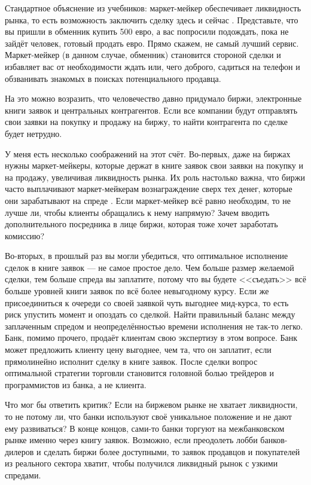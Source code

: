 Стандартное объяснение из учебников: маркет-мейкер обеспечивает ликвидность
рынка, то есть возможность заключить сделку здесь и сейчас \cite[p.
159,223]{hull2015options}. Представьте, что вы пришли в обменник купить
\num{500} евро, а вас попросили подождать, пока не зайдёт человек, готовый
продать евро. Прямо скажем, не самый лучший сервис. Маркет-мейкер (в данном
случае, обменник) становится стороной сделки и избавляет вас от необходимости
ждать или, чего доброго, садиться на телефон и обзванивать знакомых в поисках
потенциального продавца.

На это можно возразить, что человечество давно придумало биржи, электронные
книги заявок и центральных контрагентов. Если все компании будут отправлять свои
заявки на покупку и продажу на биржу, то найти контрагента по сделке будет
нетрудно.

У меня есть несколько соображений на этот счёт. Во-первых, даже на биржах нужны
маркет-мейкеры, которые держат в книге заявок свои заявки на покупку и на
продажу, увеличивая ликвидность рынка. Их роль настолько важна, что биржи часто
выплачивают маркет-мейкерам вознаграждение сверх тех денег, которые они
зарабатывают на спреде \cite{moex2018mm}\cite[ch. 7]{hasbrouck2017securities}.
Если маркет-мейкер всё равно необходим, то не лучше ли, чтобы клиенты обращались
к нему напрямую? Зачем вводить дополнительного посредника в лице биржи, которая
тоже хочет заработать комиссию?

Во-вторых, в прошлый раз вы могли убедиться, что оптимальное исполнение сделок в
книге заявок --- не самое простое дело. Чем больше размер желаемой сделки, тем
больше спреда вы заплатите, потому что вы будете <<съедать>> всё больше уровней
книги заявок по всё более невыгодному курсу. Если же присоединиться к очереди со
своей заявкой чуть выгоднее мид-курса, то есть риск упустить момент и опоздать
со сделкой. Найти правильный баланс между заплаченным спредом и
неопределённостью времени исполнения не так-то легко. Банк, помимо прочего,
продаёт клиентам свою экспертизу в этом вопросе. Банк может предложить клиенту
цену выгоднее, чем та, что он заплатит, если прямолинейно исполнит сделку в
книге заявок. После сделки вопрос оптимальной стратегии торговли становится
головной болью трейдеров и программистов из банка, а не клиента.

Что мог бы ответить критик? Если на биржевом рынке не хватает ликвидности, то не
потому ли, что банки используют своё уникальное положение и не дают ему
развиваться? В конце концов, сами-то банки торгуют на межбанковском рынке именно
через книгу заявок. Возможно, если преодолеть лобби банков-дилеров и сделать
биржи более доступными, то заявок продавцов и покупателей из реального сектора
хватит, чтобы получился ликвидный рынок с узкими спредами.

